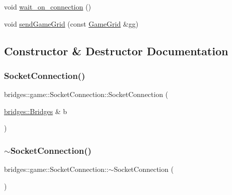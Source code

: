 \begin{DoxyCompactItemize}
\item 
void \hyperlink{classbridges_1_1game_1_1_socket_connection_a980c30bac8384993c25592a62eb4f26e}{wait\+\_\+on\+\_\+connection} ()
\item 
void \hyperlink{classbridges_1_1game_1_1_socket_connection_a8786dfba92d142101750cbc95cc59ba4}{send\+Game\+Grid} (const \hyperlink{classbridges_1_1game_1_1_game_grid}{Game\+Grid} \&gg)
\end{DoxyCompactItemize}


\subsection{Constructor \& Destructor Documentation}
\mbox{\label{classbridges_1_1game_1_1_socket_connection_a4937228506e9ca92238a9be8c200e6bb}} 
\subsubsection{\texorpdfstring{Socket\+Connection()}{SocketConnection()}}
{\footnotesize\ttfamily bridges\+::game\+::\+Socket\+Connection\+::\+Socket\+Connection (\begin{DoxyParamCaption}\item[{\hyperlink{classbridges_1_1_bridges}{bridges\+::\+Bridges} \&}]{b }\end{DoxyParamCaption})\hspace{0.3cm}{\ttfamily [inline]}}

\mbox{\label{classbridges_1_1game_1_1_socket_connection_ab91626d225be212db188465f73c5de27}} 
\subsubsection{\texorpdfstring{$\sim$\+Socket\+Connection()}{~SocketConnection()}}
{\footnotesize\ttfamily bridges\+::game\+::\+Socket\+Connection\+::$\sim$\+Socket\+Connection (\begin{DoxyParamCaption}{ }\end{DoxyParamCaption})\hspace{0.3cm}{\ttfamily [inline]}}



